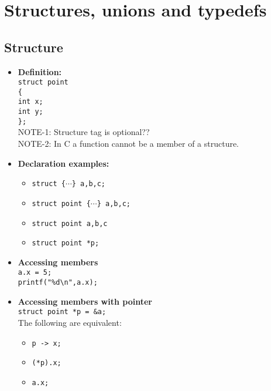\section{Structures, unions and typedefs}

\subsection{Structure}

\begin{itemize}
\item \textbf{Definition:}\\
\texttt{struct point}\\
\texttt{\{}\\
\qquad \texttt{int x;}\\
\qquad \texttt{int y;}\\
\texttt{\};}\\

NOTE-1: Structure tag is optional??\\
NOTE-2: In C  a function cannot be a member of a structure.\\

\item \textbf{Declaration examples:}\\
\begin{itemize}
\item \texttt{struct \{$\cdots$\} a,b,c;}\\
\item \texttt{struct point \{$\cdots$\} a,b,c;}\\
\item \texttt{struct point a,b,c}\\
\item \texttt{struct point *p;}\\
\end{itemize}

\item \textbf{Accessing members}\\
\texttt{a.x = 5;}\\
\texttt{printf("\%d\textbackslash n",a.x);}\\

\item \textbf{Accessing members with pointer}\\
\texttt{struct point *p = \&a;}\\
The following are equivalent:\\
\begin{itemize}
\item \texttt{p -> x;}\\
\item \texttt{(*p).x;}\\
\item \texttt{a.x;}
\end{itemize}


\end{itemize}
